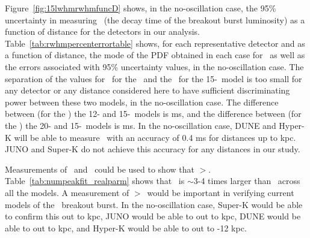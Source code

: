 Figure~\ref{fig:15lwhmrwhmfuncD} 
shows, in the no-oscillation case, the 95\% uncertainty in
measuring \tfall\ (the decay time of the breakout burst luminosity) 
as a function of distance for the detectors in our analysis. 
Table~\ref{tab:rwhmpercenterrortable} shows, for each representative
detector and as a function of distance, the mode of the PDF obtained
in each case for \tfall\ as well as the 
errors associated with 95\% uncertainty values, in the no-oscillation case.
The separation of the values for \tfall\ for the \ls\ and the \shen\
for the 15-\Msol\ 
model is too small for any detector or any distance
considered here to have sufficient discriminating power between these
two models, in the no-oscillation case.  
The difference between (for the \ls) the 12- and
15-\Msol\ models is \abt 0.4 ms, and the difference between (for the
\ls) the 20- and 15-\Msol\ models is \abt 0.9 ms. In the
no-oscillation case, DUNE and Hyper-K will be able to
measure \tfall\ with an accuracy of 0.4 ms for distances up to 
kpc.  JUNO and
Super-K do not achieve this accuracy for any distances in our study.

Measurements of \trise\ and \tfall\ could be used
to show that \tfall$>$\trise.  Table~\ref{tab:numpeakfit_realparm}
shows that \tfall\ is $\sim$3-4 times larger than \trise\ across all
the models.  A measurement of \tfall$>$\trise\ would be important in
verifying current models of the \nue\ breakout burst.   In the
no-oscillation case, Super-K would be able to confirm this out to \abt
2 kpc, JUNO 
would be able to out to \abt 3 kpc, 
DUNE would be able to out to  kpc,  and Hyper-K would be able to
out to \abt 11-12 kpc.


